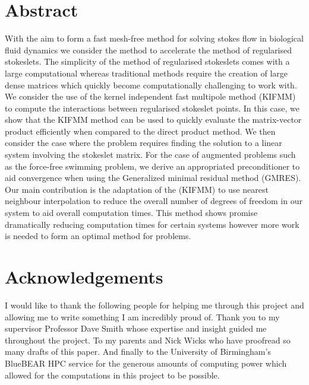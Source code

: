 \documentclass[12pt,twoside,a4paper]{article}
\numberwithin{equation}{section}
\begin{document}


\newpage



\section*{Abstract}
With the aim to form a fast mesh-free method for solving stokes flow in biological fluid dynamics we consider the method to accelerate the method of regularised stokeslets. The simplicity of the method of regularised stokeslets comes with a large computational whereas traditional methods require the creation of large dense matrices which quickly become computationally challenging to work with. We consider the use of the kernel independent fast multipole method (KIFMM) to compute the interactions between regularised stokeslet points. In this case, we show that the KIFMM method can be used to quickly evaluate the matrix-vector product  efficiently when compared to the direct product method. We then consider the case where the problem requires finding the solution to a linear system involving the stokeslet matrix. For the case of augmented problems such as the force-free swimming problem, we derive an appropriated preconditioner to aid convergence when using the Generalized minimal residual method (GMRES). Our main contribution is the adaptation of the (KIFMM) to use nearest neighbour interpolation to reduce the overall number of degrees of freedom in our system to aid overall computation times. This method shows promise dramatically reducing computation times for certain systems however more work is needed to form an optimal method for problems. 

\newpage
\section*{Acknowledgements}
I would like to thank the following people for helping me through this project and allowing me to write something I am incredibly proud of. Thank you to my supervisor Professor Dave Smith whose expertise and insight guided me throughout the project. To my parents and Nick Wicks who have proofread so many drafts of this paper. And finally to the University of Birmingham's BlueBEAR HPC service for the generous amounts of computing power which allowed for the computations in this project to be possible. 


\begin{singlespace}
\pagestyle{contents}
\newpage
{
  \hypersetup{hidelinks}
  \tableofcontents
}

\newpage
\listoffigures
\newpage
\listoftables
\listofalgorithms
\end{singlespace}

\pagestyle{fancy}

\newpage








\newpage


\FloatBarrier

\begin{singlespace}
\printbibliography[heading=bibintoc]
\end{singlespace}
\end{document}
